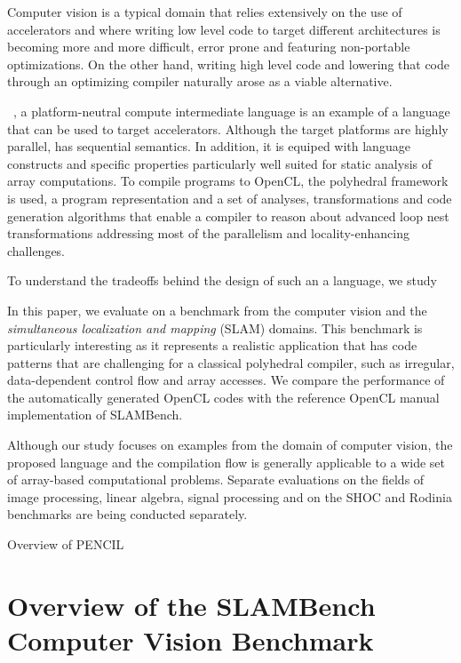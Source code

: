 \documentclass{llncs}
\begin{document}
Computer vision is a typical domain that relies extensively on the
use of accelerators and where writing low level code to target
different architectures is becoming more and more difficult, error
prone and featuring non-portable optimizations.
On the other hand, writing high level code and lowering that code
through an optimizing compiler naturally arose as a viable alternative.

\pencil{}~\cite{pencil}, a platform-neutral compute intermediate
language is an example of a language that can be used to target
accelerators.
Although the target platforms are highly parallel, \pencil{} has
sequential semantics.  In addition, it is equiped with language
constructs and specific properties particularly well
suited for static analysis of array computations.
To compile \pencil{} programs to OpenCL, the polyhedral framework is used,
a program representation and a set of analyses, transformations and code
generation algorithms that enable a compiler to reason about advanced
loop nest transformations addressing most of the parallelism and
locality-enhancing challenges.

To understand the tradeoffs behind the design of such an a
language, we study 


In this paper, we evaluate \pencil{} on a benchmark from the computer
vision and the \textit{simultaneous localization and mapping} (SLAM)
domains.
This benchmark is particularly interesting as it represents a realistic
application that has code patterns that are challenging for a classical
polyhedral compiler, such as irregular, data-dependent control flow
and array accesses.
We compare the performance of the automatically generated OpenCL codes
with the reference OpenCL manual implementation of SLAMBench.

Although our study focuses on examples from the domain of computer
vision, the proposed language and the \pencil{} compilation flow
is generally applicable to a wide set of array-based computational
problems.
Separate evaluations on the fields of image processing, linear algebra,
signal processing and on the SHOC and Rodinia benchmarks are being
conducted separately.


Overview of PENCIL



\section{Overview of the SLAMBench Computer Vision Benchmark}
\end{document}
